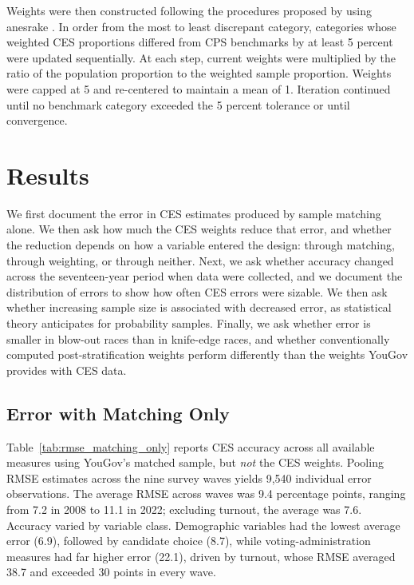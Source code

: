 \documentclass[12pt]{article}
\begin{document}


Weights were then constructed following the procedures proposed by \textcite{debell_computing_2009} using anesrake \parencite{pasek_anesrake_2018}. In order from the most to least discrepant category, categories whose weighted CES proportions differed from CPS benchmarks by at least 5 percent were updated sequentially. At each step, current weights were multiplied by the ratio of the population proportion to the weighted sample proportion. Weights were capped at 5 and re-centered to maintain a mean of 1. Iteration continued until no benchmark category exceeded the 5 percent tolerance or until convergence. 

\section{Results}\label{sec:results}
We first document the error in CES estimates produced by sample matching alone. We then ask how much the CES weights reduce that error, and whether the reduction depends on how a variable entered the design: through matching, through weighting, or through neither. Next, we ask whether accuracy changed across the seventeen-year period when data were collected, and we document the distribution of errors to show how often CES errors were sizable. We then ask whether increasing sample size is associated with decreased error, as statistical theory anticipates for probability samples. Finally, we ask whether error is smaller in blow-out races than in knife-edge races, and whether conventionally computed post-stratification weights perform differently than the weights YouGov provides with CES data.

\subsection{Error with Matching Only}

Table~\ref{tab:rmse_matching_only} reports CES accuracy across all available measures using YouGov's matched sample, but \textit{not} the CES weights. Pooling RMSE estimates across the nine survey waves yields 9,540 individual error observations. The average RMSE across waves was 9.4 percentage points, ranging from 7.2 in 2008 to 11.1 in 2022; excluding turnout, the average was 7.6. Accuracy varied by variable class. Demographic variables had the lowest average error (6.9), followed by candidate choice (8.7), while voting-administration measures had far higher error (22.1), driven by turnout, whose RMSE averaged 38.7 and exceeded 30 points in every wave.
\end{document}
